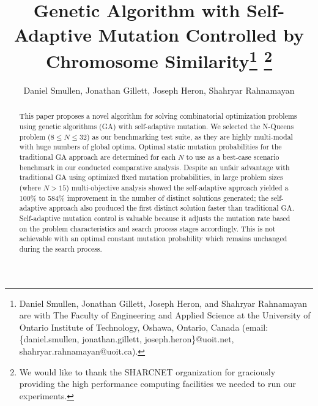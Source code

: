 \documentclass[conference]{IEEEtran}
\begin{document}
\title{\ \\ \LARGE\bf Genetic Algorithm with Self-Adaptive Mutation Controlled by Chromosome Similarity\thanks{Daniel Smullen, Jonathan Gillett, Joseph Heron, and Shahryar Rahnamayan are with The Faculty of Engineering and Applied Science at the University of Ontario Institute of Technology, Oshawa, Ontario, Canada (email: \{daniel.smullen, jonathan.gillett, joseph.heron\}@uoit.net, shahryar.rahnamayan@uoit.ca).} \thanks{We would like to thank the SHARCNET organization for graciously providing the high performance computing facilities we needed to run our experiments.}}

\author{Daniel Smullen, Jonathan Gillett, Joseph Heron, Shahryar Rahnamayan}


\maketitle

\begin{abstract}
This paper proposes a novel algorithm for solving combinatorial optimization problems using genetic algorithms (GA) with self-adaptive mutation. We selected the N-Queens problem ($8 \leq N \leq 32$) as our benchmarking test suite, as they are highly multi-modal with huge numbers of global optima. Optimal static mutation probabilities for the traditional GA approach are determined for each $N$ to use as a best-case scenario benchmark in our conducted comparative analysis. Despite an unfair advantage with traditional GA using optimized fixed mutation probabilities, in large problem sizes (where $N > 15$) multi-objective analysis showed the self-adaptive approach yielded a 100\% to 584\% improvement in the number of distinct solutions generated; the self-adaptive approach also produced the first distinct solution faster than traditional GA. Self-adaptive mutation control is valuable because it adjusts the mutation rate based on the problem characteristics and search process stages accordingly. This is not achievable with an optimal constant mutation probability which remains unchanged during the search process.
\end{abstract}
\end{document}
